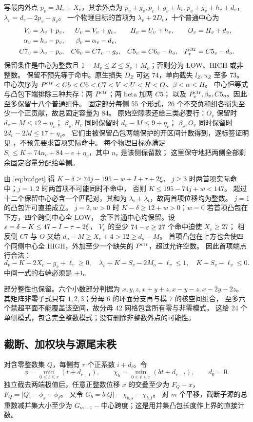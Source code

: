\documentclass[11pt,a4paper]{article}
\begin{document}
写最内外点 $p_v=M_v+X_v$，其余外点为
$p_v+g_v,p_v+g_v+h_v,p_v+g_v+h_v+d_v$，
$\lambda_v=d_v-2p_v-g_v$。
一个物理目标的首项为 $\lambda_v+2D_v$，十个普通中心为
\begin{align*}
 V_v&=\lambda_v+p_v,&U_v&=V_v+g_v,&H_v&=U_v+h_v,&O_v&=H_v+d_v,\\
 \alpha_v&=h_v-p_v,&\beta_v&=\alpha_v-d_v,\\
 C7_v&=\lambda_v-p_o,&C6_v&=C7_v-g_o,&C5_v&=C6_v-h_o,&P_v^{\rm ctr}&=C5_v-d_o.
\end{align*}
保留条件是中心为整数且 $1-M_v\le Z\le S_v+M_o$；否则分为 LOW、HIGH 或非整数。
保留不预先等于命中。原生损失 $D_Z$ 可达 74，单向截失 $l_Z,u_Z$ 至多 73。
中心次序为
$P^{\rm ctr}<C5<C6<C7<V<U<H<O$、$\beta<\alpha<H$。
中心恒等式与凸包下端排除三种共存：两 $P^{\rm ctr}$；两 beta 加两 $C5$；
以及 $P_v^{\rm ctr},\beta_v,C5_o$。因此至多保留十八个普通组件。
固定部分每侧 55 个形式，26 个不交负和组各损失至少一个正贡献，故总固定容量为 84。
原始空隙表还给三类必要行：$O_v$ 保留时 $d_v-M\le12+\eta_v$；
$\beta_v,H_v$ 同时保留时 $d_v-M\le9+\eta_v$；
$\beta_v,O_v$ 同时保留时 $2d_v-2M\le17+\eta_v$。
它们由被保留凸包两端保护的开区间计数得到，逐标签证明见
，不预先要求首项实际命中。
每个物理目标亦满足 $S_v\le K+74n_v+84-e+\eta_v$，其中 $n_v$ 是该侧保留数；
这里保守地把两侧全部剩余固定容量分配给单侧。

由 \eqref{eq:budget} 得 $K-\delta\ge74j-195-w+I+\tau+2\xi$。
$j\ge3$ 时两首项实际命中；$j=1,2$ 时两首项不可能同时不命中，
否则 $K\le195-74j+w<147$。
超过十二个保留中心必含一个匹配对，其和为 $\lambda_s+\lambda_t$，故两首项位移均为整数。
$j=1$ 的凸包许可直接成立。
$j=2,w>0$ 时 $K-\delta\ge12+w>0$；$w=0$ 若首项凸包在下方，四个跨侧中心全 LOW，
余下普通中心均保留。设 $\varepsilon=\delta-K\le47-I-\tau-2\xi$，
$V_v$ 的至少 $74-\varepsilon\ge27$ 个命中迫使 $X_v\ge27$；
相反侧 $C7$ 与 $O$ 又给 $d_o-M\ge X_v+4>12\ge d_o-M$。
首项凸包在上方也会使四个同侧中心全 HIGH，外加至少一个缺失的 $P^{\rm ctr}$，超过允许空数。
因此首项端点行合法：
\[
 d_v-K-2X_v-g_v+\ell_v\ge0,\quad
 \lambda_v+K-S_v-2M_o-\ell_v\le1,\quad K-S_v-\ell_v\le0.
\]
中间一式的右端必须是 $+1$。

部分整性也保留。六个小数部分判据为
$x,y,z,x+y+z,x-y-z,x-2y-2z$。
其矩阵非零子式只有 $1,2,3$；分母 6 的环面分支再与模 7 的核空间组合，
至多六个禁超平面不能覆盖该空间，故分母 42 网格包含所有零与非零模式。
这给 24 个单侧模式，包含完全整数模式；没有删除非整数外点的可能性。

\subsection{截断、加权块与源尾末秩}
对含零整数集 $Q$，每侧有 $r$ 个正系数 $i+d_i$。令
\[
 \phi=\min_{0\le t\le r}(t+d_{r-t}),\qquad
 \chi_b=\min_{0\le t\le r}(bt+d_{r-t}),\qquad d_0=0.
\]
独立截去两端极值后，任意正整数位移 $x$ 的交叠至少为 $F_Q-x$，
$F_Q=|Q|-\phi_s-\phi_t$。
又令 $G_b=b|Q|-\chi_{b,s}-\chi_{b,t}$。
对 $m$ 个平移，截断子源的总重数减并集大小至少为
$G_{m-1}-$中心跨度；这是用并集凸包长度作上界的直接计数。
\end{document}
